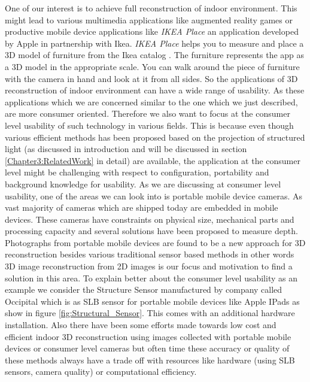One of our interest is to achieve full reconstruction of indoor environment. This might lead to various multimedia applications like augmented reality games or productive mobile device applications like \textit{IKEA Place} an application developed by Apple in partnership with Ikea. \textit{IKEA Place} helps you to measure and place a 3D model of furniture from the Ikea catalog \cite{lehnert2017neue}. The furniture represents the app as a 3D model in the appropriate scale. You can walk around the piece of furniture with the camera in hand and look at it from all sides. So the applications of 3D reconstruction of indoor environment can have a wide range of usability. As these applications which we are concerned similar to the one which we just described, are more consumer oriented. Therefore we also want to focus at the consumer level usability of such technology in various fields. This is because even though various efficient methods has been proposed based on the projection of structured light (as discussed in introduction and will be discussed in section \ref{Chapter3:RelatedWork} in detail) are available, the application at the consumer level might be challenging with respect to configuration, portability and background knowledge for usability. As we are discussing at consumer level usability, one of the areas we can look into is portable mobile device cameras. As vast majority of cameras which are shipped today are embedded in mobile devices. These cameras have constraints on physical size, mechanical parts and processing capacity and several solutions have been proposed to measure depth. Photographs from portable mobile devices are found to be a new approach for 3D reconstruction besides various traditional sensor based methods \cite{micheletti2015investigating, adan20113d} in other words 3D image reconstruction from 2D images is our focus and motivation to find a solution in this area. To explain better about the consumer level usability as an example we consider the Structure Sensor manufactured by company called Occipital which is as SLB sensor for portable mobile devices like Apple IPads as show in figure \ref{fig:Structural_Sensor}. This comes with an additional hardware installation. Also there have been some efforts made towards low cost and efficient indoor 3D reconstruction using images collected with portable mobile devices or consumer level cameras \cite{ding2019low} but often time these accuracy or quality of these methods always have a trade off with resources like hardware (using SLB sensors, camera quality) or computational efficiency.

